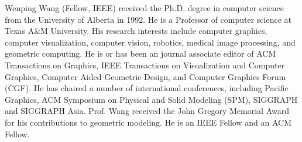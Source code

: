
\begin{IEEEbiography}{Wenping Wang}
(Fellow, IEEE) received the Ph.D. degree in computer science from the University of Alberta in 1992. He is a Professor of computer science at Texas A\&M University. His research interests include computer graphics, computer visualization, computer vision, robotics, medical image processing, and geometric computing. He is or has been an journal associate editor of ACM Transactions on Graphics, IEEE Transactions on Visualization and Computer Graphics, Computer Aided Geometric Design, and Computer Graphics Forum (CGF). He has chaired a number of international conferences, including Pacific Graphics, ACM Symposium on Physical and Solid Modeling (SPM), SIGGRAPH and SIGGRAPH Asia. Prof. Wang received the John Gregory Memorial Award for his contributions to geometric modeling. He is an IEEE Fellow and an ACM Fellow.
\end{IEEEbiography}